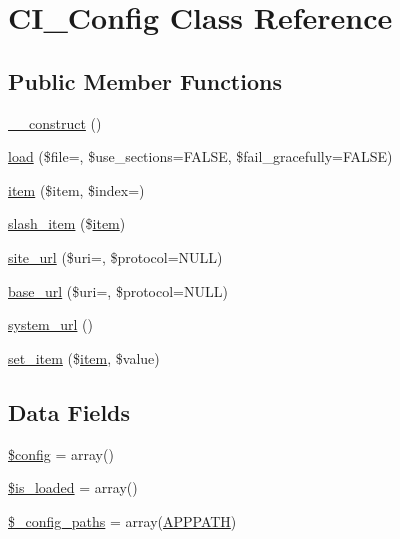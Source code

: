 \hypertarget{class_c_i___config}{}\section{C\+I\+\_\+\+Config Class Reference}
\label{class_c_i___config}
\subsection*{Public Member Functions}
\begin{DoxyCompactItemize}
\item 
\mbox{\hyperlink{class_c_i___config_a095c5d389db211932136b53f25f39685}{\+\_\+\+\_\+construct}} ()
\item 
\mbox{\hyperlink{class_c_i___config_a057a1ef8c730d6e00e3eeccbafe46f0d}{load}} (\$file=\textquotesingle{}\textquotesingle{}, \$use\+\_\+sections=F\+A\+L\+SE, \$fail\+\_\+gracefully=F\+A\+L\+SE)
\item 
\mbox{\hyperlink{class_c_i___config_a5fcaaca1b4d8a9d4c96311ce97d398c0}{item}} (\$item, \$index=\textquotesingle{}\textquotesingle{})
\item 
\mbox{\hyperlink{class_c_i___config_abead21ebddc51d12402b5320d531eb1f}{slash\+\_\+item}} (\$\mbox{\hyperlink{class_c_i___config_a5fcaaca1b4d8a9d4c96311ce97d398c0}{item}})
\item 
\mbox{\hyperlink{class_c_i___config_a3a12687251c502cb2d9c1e3f77ca56b8}{site\+\_\+url}} (\$uri=\textquotesingle{}\textquotesingle{}, \$protocol=N\+U\+LL)
\item 
\mbox{\hyperlink{class_c_i___config_a209120be5e55785e74609097123b40cf}{base\+\_\+url}} (\$uri=\textquotesingle{}\textquotesingle{}, \$protocol=N\+U\+LL)
\item 
\mbox{\hyperlink{class_c_i___config_a71e857f8dd38c230f1ce11bacf177ba8}{system\+\_\+url}} ()
\item 
\mbox{\hyperlink{class_c_i___config_a3cbd3bcacb546d42f5dd12213df48627}{set\+\_\+item}} (\$\mbox{\hyperlink{class_c_i___config_a5fcaaca1b4d8a9d4c96311ce97d398c0}{item}}, \$value)
\end{DoxyCompactItemize}
\subsection*{Data Fields}
\begin{DoxyCompactItemize}
\item 
\mbox{\hyperlink{class_c_i___config_a49c7011be9c979d9174c52a8b83e5d8e}{\$config}} = array()
\item 
\mbox{\hyperlink{class_c_i___config_a908e9ad52a5d1956d360689452f6bdbe}{\$is\+\_\+loaded}} = array()
\item 
\mbox{\hyperlink{class_c_i___config_a5f47dbd2111b5bb6c91ece69fefebf26}{\$\+\_\+config\+\_\+paths}} = array(\mbox{\hyperlink{index_8php_a644e58bbe10b41e25c0768345587f4aa}{A\+P\+P\+P\+A\+TH}})
\end{DoxyCompactItemize}
